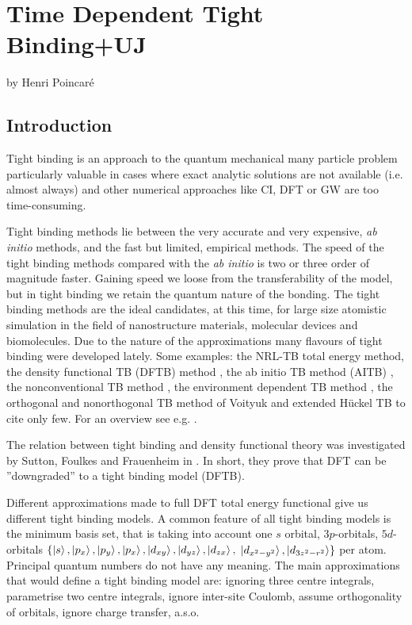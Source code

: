 \chapter[TDTB+UJ]%
{Time Dependent Tight Binding+UJ}
\label{ch:one}
%
{by Henri Poincar\'e}
%
\section{Introduction}
\par{Tight binding is an approach to the quantum mechanical many particle problem particularly valuable in cases
where exact analytic solutions are not available (i.e. almost always) and other numerical approaches
like CI, DFT or GW are too time-consuming.}
\par{Tight binding methods lie between the very accurate and very expensive,
\emph{ab initio} methods, and the fast but limited, empirical methods. The
speed of the tight binding methods compared with the \emph{ab initio} is two
or three order of magnitude faster. Gaining speed we loose from the
transferability of the model, but in tight binding we retain the quantum
nature of the bonding. The tight binding methods are the ideal candidates, at
this time, for large size atomistic simulation in the field of nanostructure materials, molecular devices and biomolecules. Due to the nature of the approximations many flavours of tight binding were developed lately. Some examples: the NRL-TB total energy method\citep{Mehl96}, the density functional TB (DFTB) method \citep{Frauenheim00,Elstner98,Elstner07,Seifert07}, the ab initio TB method (AITB) \citep{Sankey89, Horsfield97, Tu06}, the nonconventional TB method \citep{Khakimov05}, the environment dependent TB method \citep{Tang96}, the orthogonal and nonorthogonal TB method of Voityuk \citep{Voityuk06,Voityuk06b} and extended H\"{u}ckel TB\citep{Rincon08} to cite only few. For an overview see e.g. \citep{Finnis03,Goringe97b}.}
\par{The relation between tight binding and density functional theory was
  investigated by Sutton, Foulkes and Frauenheim in \citep{Sutton88,Foulkes89,Frauenheim00}. In short, they
  prove that DFT can be ''downgraded'' to a tight binding model (DFTB).}
\par{Different approximations made to full DFT total energy functional give us
different tight binding models. A common feature of all tight binding models
is the minimum basis set, that is taking into account  one $s$ orbital,
$3p$-orbitals, $5d$-orbitals
$\{\mathinner{|{s}\rangle},\mathinner{|{p_x}\rangle},\mathinner{|{p_y}\rangle},\mathinner{|{p_x}\rangle},\mathinner{|{d_{xy}}\rangle},\mathinner{|{d_{yz}}\rangle},\mathinner{|{d_{zx}}\rangle},$
$\mathinner{|{d_{x^2-y^2}}\rangle},\mathinner{|{d_{3z^2-r^2}}\rangle}\}$
per atom. Principal quantum numbers do not have any meaning. The main
approximations that would define a tight binding model are: ignoring three
centre integrals, parametrise two centre integrals, ignore inter-site Coulomb,
assume orthogonality of orbitals, ignore charge transfer, a.s.o.}
